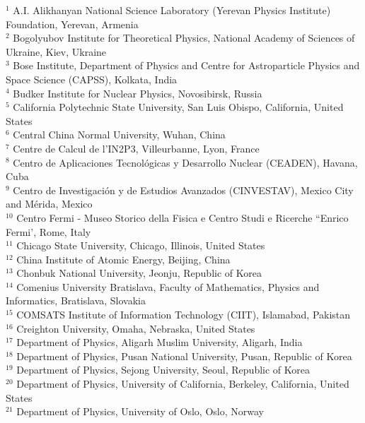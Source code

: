 \begin{flushleft}
$^{1}$ A.I. Alikhanyan National Science Laboratory (Yerevan Physics Institute) Foundation, Yerevan, Armenia\\
$^{2}$ Bogolyubov Institute for Theoretical Physics, National Academy of Sciences of Ukraine, Kiev, Ukraine\\
$^{3}$ Bose Institute, Department of Physics  and Centre for Astroparticle Physics and Space Science (CAPSS), Kolkata, India\\
$^{4}$ Budker Institute for Nuclear Physics, Novosibirsk, Russia\\
$^{5}$ California Polytechnic State University, San Luis Obispo, California, United States\\
$^{6}$ Central China Normal University, Wuhan, China\\
$^{7}$ Centre de Calcul de l'IN2P3, Villeurbanne, Lyon, France\\
$^{8}$ Centro de Aplicaciones Tecnol\'{o}gicas y Desarrollo Nuclear (CEADEN), Havana, Cuba\\
$^{9}$ Centro de Investigaci\'{o}n y de Estudios Avanzados (CINVESTAV), Mexico City and M\'{e}rida, Mexico\\
$^{10}$ Centro Fermi - Museo Storico della Fisica e Centro Studi e Ricerche ``Enrico Fermi', Rome, Italy\\
$^{11}$ Chicago State University, Chicago, Illinois, United States\\
$^{12}$ China Institute of Atomic Energy, Beijing, China\\
$^{13}$ Chonbuk National University, Jeonju, Republic of Korea\\
$^{14}$ Comenius University Bratislava, Faculty of Mathematics, Physics and Informatics, Bratislava, Slovakia\\
$^{15}$ COMSATS Institute of Information Technology (CIIT), Islamabad, Pakistan\\
$^{16}$ Creighton University, Omaha, Nebraska, United States\\
$^{17}$ Department of Physics, Aligarh Muslim University, Aligarh, India\\
$^{18}$ Department of Physics, Pusan National University, Pusan, Republic of Korea\\
$^{19}$ Department of Physics, Sejong University, Seoul, Republic of Korea\\
$^{20}$ Department of Physics, University of California, Berkeley, California, United States\\
$^{21}$ Department of Physics, University of Oslo, Oslo, Norway\\

\end{flushleft}
